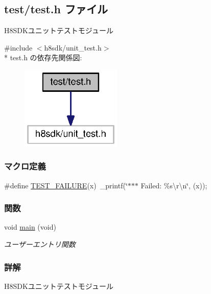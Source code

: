 \subsection{test/test.h ファイル}
\label{test_8h}


H8\+S\+D\+Kユニットテストモジュール  


{\ttfamily \#include $<$h8sdk/unit\+\_\+test.\+h$>$}\\*
test.\+h の依存先関係図\+:
\nopagebreak
\begin{figure}[H]
\begin{center}
\leavevmode
\includegraphics[width=136pt]{de/dc1/test_8h__incl}
\end{center}
\end{figure}
\subsubsection*{マクロ定義}
\begin{DoxyCompactItemize}
\item 
\#define \hyperlink{test_8h_acefd270dacb1cf3685e5069fb5ea292c_acefd270dacb1cf3685e5069fb5ea292c}{T\+E\+S\+T\+\_\+\+F\+A\+I\+L\+U\+R\+E}(x)~\+\_\+printf(\char`\"{}$\ast$$\ast$$\ast$ Failed\+: \%s\textbackslash{}r\textbackslash{}n\char`\"{}, (x));
\end{DoxyCompactItemize}
\subsubsection*{関数}
\begin{DoxyCompactItemize}
\item 
void \hyperlink{test_8h_a6288eba0f8e8ad3ab1544ad731eb7667_a6288eba0f8e8ad3ab1544ad731eb7667}{main} (void)
\begin{DoxyCompactList}\small\item\em ユーザーエントリ関数 \end{DoxyCompactList}\end{DoxyCompactItemize}


\subsubsection{詳解}
H8\+S\+D\+Kユニットテストモジュール 

